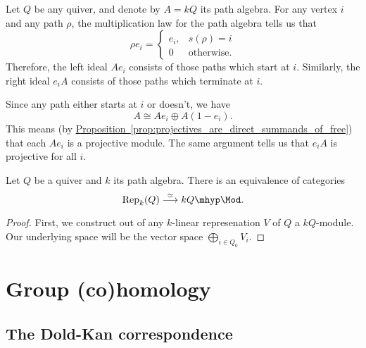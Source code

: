 \documentclass[main.tex]{subfiles}
\begin{document}
\begin{example}
  \label{eg:left_ideals_of_path_algebra_are_projective}
  Let $Q$ be any quiver, and denote by $A = kQ$ its path algebra. For any vertex $i$ and any path $\rho$, the multiplication law for the path algebra tells us that
  \begin{equation*}
    \rho e_{i} =
    \begin{cases}
      e_{i}, & s(\rho) = i \\
      0 & \text{otherwise}.
    \end{cases}
  \end{equation*}
  Therefore, the left ideal $A e_{i}$ consists of those paths which start at $i$. Similarly, the right ideal $e_{i} A$ consists of those paths which terminate at $i$.

  Since any path either starts at $i$ or doesn't, we have
  \begin{equation*}
    A \cong Ae_{i} \oplus A(1 - e_{i}).
  \end{equation*}
  This means (by \hyperref[prop:projectives_are_direct_summands_of_free]{Proposition~\ref*{prop:projectives_are_direct_summands_of_free}}) that each $Ae_{i}$ is a projective module. The same argument tells us that $e_{i}A$ is projective for all $i$.
\end{example}

\begin{proposition}
  Let $Q$ be a quiver and $k$ its path algebra. There is an equivalence of categories
  \begin{equation*}
    \mathrm{Rep}_{k}(Q) \overset{\simeq}{\longrightarrow} kQ\mhyp\Mod.
  \end{equation*}
\end{proposition}
\begin{proof}
  First, we construct out of any $k$-linear represenation $V$ of $Q$ a $kQ$-module. Our underlying space will be the vector space $\bigoplus_{i \in Q_{0}} V_{i}$.
\end{proof}


\section{Group (co)homology}
\label{sec:group_co_homology}

\subsection{The Dold-Kan correspondence}
\label{ssc:the_dold_kan_correspondence}
\end{document}
